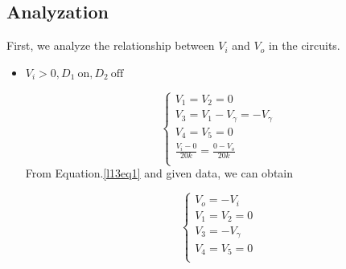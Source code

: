     \subsection{Analyzation}
    First, we analyze the relationship between $V_i$ and $V_o$ in the circuits.\par
    \begin{itemize}
        \item $V_i > 0, D_1~\text{on}, D_2~\text{off}$\par
            \begin{equation}
                \begin{cases}
                    V_1=V_2=0\\
                    V_3=V_1-V_\gamma=-V_\gamma\\
                    V_4=V_5=0\\
                    \frac{V_i-0}{20k} = \frac{0-V_o}{20k}\\
                \end{cases}
                \label{l13eq1}
            \end{equation}
            From Equation.\ref{l13eq1} and given data, we can obtain\par
            \begin{equation*}
                \begin{cases}
                    V_o=-V_i\\
                    V_1=V_2=0\\
                    V_3=-V_\gamma\\
                    V_4=V_5=0\\
                \end{cases}
            \end{equation*}
            

\end{itemize}
